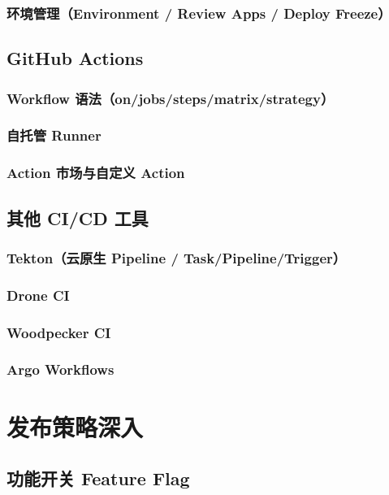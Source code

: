 \documentclass[12pt,UTF8]{ctexbook}
\begin{document}
    \subsection{环境管理（Environment / Review Apps / Deploy Freeze）}

  \section{GitHub Actions}
    \subsection{Workflow 语法（on/jobs/steps/matrix/strategy）}
    \subsection{自托管 Runner}
    \subsection{Action 市场与自定义 Action}

  \section{其他 CI/CD 工具}
    \subsection{Tekton（云原生 Pipeline / Task/Pipeline/Trigger）}
    \subsection{Drone CI}
    \subsection{Woodpecker CI}
    \subsection{Argo Workflows}


\chapter{发布策略深入}
\label{chap:release-strategy}

  \section{功能开关 Feature Flag}
\end{document}
